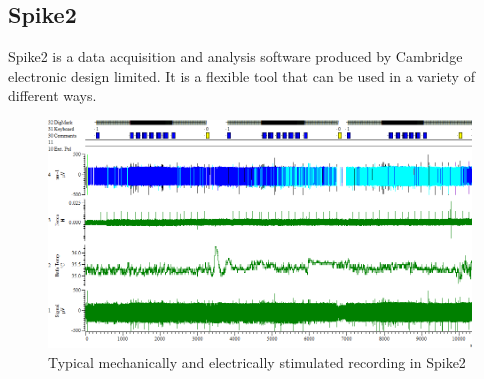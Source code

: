 \subsection{Spike2}

Spike2 is a data acquisition and analysis software produced by Cambridge electronic design limited. It is a flexible tool that can be used in a variety of different ways.

\begin{figure}
	\includegraphics[width = \textwidth]{src/pic/Spike2_screenshot}
	\caption{Typical mechanically and electrically stimulated recording in Spike2}
	\label{fig:spike2}
\end{figure}

